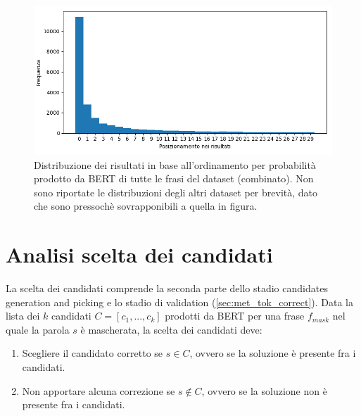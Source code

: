 \begin{figure}[H]
\centering
\includegraphics[width=\textwidth]{immagini/analisi/score_order_Combinato}
\caption{Distribuzione dei risultati in base all'ordinamento per probabilità prodotto da BERT di tutte le frasi del dataset (combinato). Non sono riportate le distribuzioni degli altri dataset per brevità, dato che sono pressochè sovrapponibili a quella in figura.}
\label{fig:ana_scoreorder}
\end{figure}



\section{Analisi scelta dei candidati}
\label{sec:ana_cor}

La scelta dei candidati comprende la seconda parte dello stadio candidates generation and picking e lo stadio di validation (\autoref{sec:met_tok_correct}). Data la lista dei $k$ candidati $C = [c_1,...,c_k]$ prodotti da BERT per una frase $f_{mask}$ nel quale la parola $s$ è mascherata, la scelta dei candidati deve:

\begin{enumerate}
\item Scegliere il candidato corretto se $s \in C$, ovvero se la soluzione è presente fra i candidati.

\item Non apportare alcuna correzione se $s \not\in C$, ovvero se la soluzione non è presente fra i candidati.
\end{enumerate}


